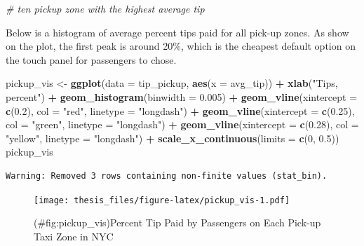 \documentclass[12pt,twoside]{reedthesis}
\newenvironment{Shaded}{\begin{snugshade}}{\end{snugshade}}
\newcommand{\KeywordTok}[1]{\textcolor[rgb]{0.13,0.29,0.53}{\textbf{#1}}}
\newcommand{\DataTypeTok}[1]{\textcolor[rgb]{0.13,0.29,0.53}{#1}}
\newcommand{\DecValTok}[1]{\textcolor[rgb]{0.00,0.00,0.81}{#1}}
\newcommand{\FloatTok}[1]{\textcolor[rgb]{0.00,0.00,0.81}{#1}}
\newcommand{\StringTok}[1]{\textcolor[rgb]{0.31,0.60,0.02}{#1}}
\newcommand{\CommentTok}[1]{\textcolor[rgb]{0.56,0.35,0.01}{\textit{#1}}}
\newcommand{\OperatorTok}[1]{\textcolor[rgb]{0.81,0.36,0.00}{\textbf{#1}}}
\newcommand{\NormalTok}[1]{#1}
\theoremstyle{definition}
\theoremstyle{definition}
\theoremstyle{definition}
\theoremstyle{remark}
\begin{document}
\begin{Shaded}
\begin{Highlighting}[]
\CommentTok{# ten pickup zone with the highest average tip}
\end{Highlighting}
\end{Shaded}
Below is a histogram of average percent tips paid for all pick-up zones.
As show on the plot, the first peak is around 20\%, which is the
cheapest default option on the touch panel for passengers to chose.
\begin{Shaded}
\begin{Highlighting}[]
\NormalTok{pickup_vis <-}\StringTok{ }\KeywordTok{ggplot}\NormalTok{(}\DataTypeTok{data =}\NormalTok{ tip_pickup, }\KeywordTok{aes}\NormalTok{(}\DataTypeTok{x =}\NormalTok{ avg_tip)) }\OperatorTok{+}\StringTok{ }
\StringTok{    }\KeywordTok{xlab}\NormalTok{(}\StringTok{"Tips, percent"}\NormalTok{) }\OperatorTok{+}\StringTok{ }\KeywordTok{geom_histogram}\NormalTok{(}\DataTypeTok{binwidth =} \FloatTok{0.005}\NormalTok{) }\OperatorTok{+}\StringTok{ }
\StringTok{    }\KeywordTok{geom_vline}\NormalTok{(}\DataTypeTok{xintercept =} \KeywordTok{c}\NormalTok{(}\FloatTok{0.2}\NormalTok{), }\DataTypeTok{col =} \StringTok{"red"}\NormalTok{, }\DataTypeTok{linetype =} \StringTok{"longdash"}\NormalTok{) }\OperatorTok{+}\StringTok{ }
\StringTok{    }\KeywordTok{geom_vline}\NormalTok{(}\DataTypeTok{xintercept =} \KeywordTok{c}\NormalTok{(}\FloatTok{0.25}\NormalTok{), }\DataTypeTok{col =} \StringTok{"green"}\NormalTok{, }
        \DataTypeTok{linetype =} \StringTok{"longdash"}\NormalTok{) }\OperatorTok{+}\StringTok{ }\KeywordTok{geom_vline}\NormalTok{(}\DataTypeTok{xintercept =} \KeywordTok{c}\NormalTok{(}\FloatTok{0.28}\NormalTok{), }
    \DataTypeTok{col =} \StringTok{"yellow"}\NormalTok{, }\DataTypeTok{linetype =} \StringTok{"longdash"}\NormalTok{) }\OperatorTok{+}\StringTok{ }\KeywordTok{scale_x_continuous}\NormalTok{(}\DataTypeTok{limits =} \KeywordTok{c}\NormalTok{(}\DecValTok{0}\NormalTok{, }
    \FloatTok{0.5}\NormalTok{))}
\NormalTok{pickup_vis}
\end{Highlighting}
\end{Shaded}
\begin{verbatim}
Warning: Removed 3 rows containing non-finite values (stat_bin).
\end{verbatim}
\begin{figure}
\centering
\texttt{[image: thesis\_files/figure-latex/pickup\_vis-1.pdf]}
\caption{(\#fig:pickup\_vis)Percent Tip Paid by Passengers on Each
Pick-up Taxi Zone in NYC}
\end{figure}
\end{document}
